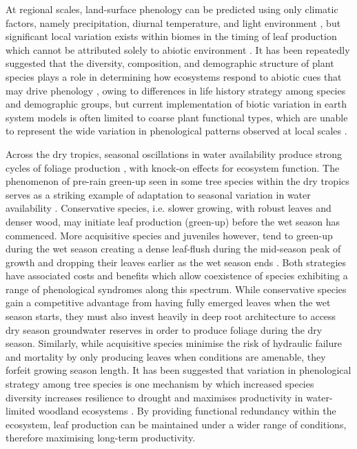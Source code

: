 \begin{refsection}
At regional scales, land-surface phenology can be predicted using only climatic factors, namely precipitation, diurnal temperature, and light environment \citep{Adole2018a}, but significant local variation exists within biomes in the timing of leaf production which cannot be attributed solely to abiotic environment \citep{Stockli2011}. It has been repeatedly suggested that the diversity, composition, and demographic structure of plant species plays a role in determining how ecosystems respond to abiotic cues that may drive phenology \citep{Adole2018b, Jeganathan2014, Fuller1999}, owing to differences in life history strategy among species and demographic groups, but current implementation of biotic variation in earth system models is often limited to coarse plant functional types, which are unable to represent the wide variation in phenological patterns observed at local scales \citep{Scheiter2013, Pavlick2013}.

Across the dry tropics, seasonal oscillations in water availability produce strong cycles of foliage production \citep{Chidumayo2001, Dahlin2016}, with knock-on effects for ecosystem function. The phenomenon of pre-rain green-up seen in some tree species within the dry tropics serves as a striking example of adaptation to seasonal variation in water availability \citep{Ryan2017}. Conservative species, i.e. slower growing, with robust leaves and denser wood, may initiate leaf production (green-up) before the wet season has commenced. More acquisitive species and juveniles however, tend to green-up during the wet season creating a dense leaf-flush during the mid-season peak of growth and dropping their leaves earlier as the wet season ends \citep{Lasky2016}. Both strategies have associated costs and benefits which allow coexistence of species exhibiting a range of phenological syndromes along this spectrum. While conservative species gain a competitive advantage from having fully emerged leaves when the wet season starts, they must also invest heavily in deep root architecture to access dry season groundwater reserves in order to produce foliage during the dry season. Similarly, while acquisitive species minimise the risk of hydraulic failure and mortality by only producing leaves when conditions are amenable, they forfeit growing season length. It has been suggested that variation in phenological strategy among tree species is one mechanism by which increased species diversity increases resilience to drought and maximises productivity in water-limited woodland ecosystems \citep{Stan2019, Morellato2016}. By providing functional redundancy within the ecosystem, leaf production can be maintained under a wider range of conditions, therefore maximising long-term productivity.


\end{refsection}
